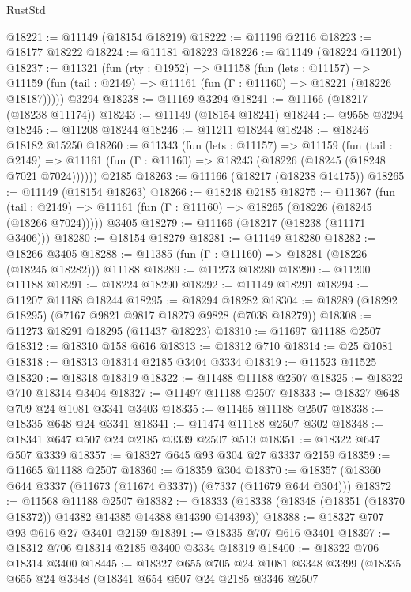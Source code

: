 \begin{lexlean}{RustStd}
\begin{coremodule}
@18221 := @11149 (@18154 @18219)
@18222 := @11196 @2116
@18223 := @18177 @18222
@18224 := @11181 @18223
@18226 := @11149 (@18224 @11201)
@18237 := @11321
    (fun (rty : @1952) =>
    @11158
      (fun (lets : @11157) =>
      @11159 (fun (tail : @2149) => @11161 (fun (Γ : @11160) => @18221 (@18226 @18187)))))
    @3294
@18238 := @11169 @3294
@18241 := @11166 (@18217 (@18238 @11174))
@18243 := @11149 (@18154 @18241)
@18244 := @9558 @3294
@18245 := @11208 @18244
@18246 := @11211 @18244
@18248 := @18246 @18182 @15250
@18260 := @11343
    (fun (lets : @11157) =>
    @11159
      (fun (tail : @2149) =>
      @11161 (fun (Γ : @11160) => @18243 (@18226 (@18245 (@18248 @7021 @7024))))))
    @2185
@18263 := @11166 (@18217 (@18238 @14175))
@18265 := @11149 (@18154 @18263)
@18266 := @18248 @2185
@18275 := @11367
    (fun (tail : @2149) => @11161 (fun (Γ : @11160) => @18265 (@18226 (@18245 (@18266 @7024)))))
    @3405
@18279 := @11166 (@18217 (@18238 (@11171 @3406)))
@18280 := @18154 @18279
@18281 := @11149 @18280
@18282 := @18266 @3405
@18288 := @11385 (fun (Γ : @11160) => @18281 (@18226 (@18245 @18282))) @11188
@18289 := @11273 @18280
@18290 := @11200 @11188
@18291 := @18224 @18290
@18292 := @11149 @18291
@18294 := @11207 @11188 @18244
@18295 := @18294 @18282
@18304 := @18289 (@18292 @18295) (@7167 @9821 @9817 @18279 @9828 (@7038 @18279))
@18308 := @11273 @18291 @18295 (@11437 @18223)
@18310 := @11697 @11188 @2507
@18312 := @18310 @158 @616
@18313 := @18312 @710
@18314 := @25 @1081
@18318 := @18313 @18314 @2185 @3404 @3334
@18319 := @11523 @11525
@18320 := @18318 @18319
@18322 := @11488 @11188 @2507
@18325 := @18322 @710 @18314 @3404
@18327 := @11497 @11188 @2507
@18333 := @18327 @648 @709 @24 @1081 @3341 @3403
@18335 := @11465 @11188 @2507
@18338 := @18335 @648 @24 @3341
@18341 := @11474 @11188 @2507 @302
@18348 := @18341 @647 @507 @24 @2185 @3339 @2507 @513
@18351 := @18322 @647 @507 @3339
@18357 := @18327 @645 @93 @304 @27 @3337 @2159
@18359 := @11665 @11188 @2507
@18360 := @18359 @304
@18370 := @18357 (@18360 @644 @3337 (@11673 (@11674 @3337)) (@7337 (@11679 @644 @304)))
@18372 := @11568 @11188 @2507
@18382 := @18333 (@18338 (@18348 (@18351 (@18370 @18372)) @14382 @14385 @14388 @14390 @14393))
@18388 := @18327 @707 @93 @616 @27 @3401 @2159
@18391 := @18335 @707 @616 @3401
@18397 := @18312 @706 @18314 @2185 @3400 @3334 @18319
@18400 := @18322 @706 @18314 @3400
@18445 := @18327
    @655
    @705
    @24
    @1081
    @3348
    @3399
    (@18335
      @655
      @24
      @3348
      (@18341
        @654
        @507
        @24
        @2185
        @3346
        @2507

\end{coremodule}
\end{lexlean}
